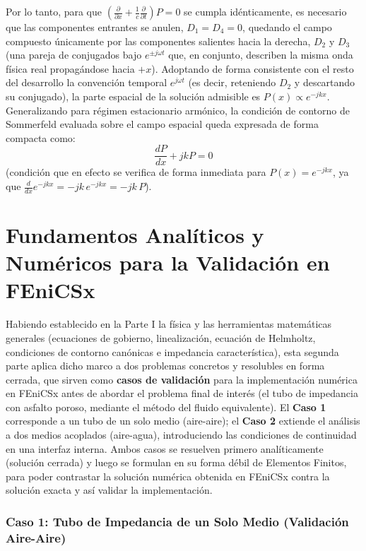 \documentclass[11pt,letterpaper]{article}
\begin{document}
Por lo tanto, para que $\left(\frac{\partial}{\partial x}+\frac1c\frac{\partial}{\partial t}\right)P=0$ se cumpla idénticamente, es necesario que las componentes entrantes se anulen, $D_1 = D_4 = 0$, quedando el campo compuesto únicamente por las componentes salientes hacia la derecha, $D_2$ y $D_3$ (una pareja de conjugados bajo $e^{\pm j\omega t}$ que, en conjunto, describen la misma onda física real propagándose hacia $+x$). Adoptando de forma consistente con el resto del desarrollo la convención temporal $e^{j\omega t}$ (es decir, reteniendo $D_2$ y descartando su conjugado), la parte espacial de la solución admisible es $P(x) \propto e^{-jkx}$. Generalizando para régimen estacionario armónico, la condición de contorno de Sommerfeld evaluada sobre el campo espacial queda expresada de forma compacta como:
\begin{equation}
    \frac{dP}{dx} + jk P = 0
\end{equation}
(condición que en efecto se verifica de forma inmediata para $P(x) = e^{-jkx}$, ya que $\frac{d}{dx}e^{-jkx} = -jk\,e^{-jkx} = -jk\,P$).

\part{Fundamentos Analíticos y Numéricos para la Validación en FEniCSx}

Habiendo establecido en la Parte I la física y las herramientas matemáticas generales (ecuaciones de gobierno, linealización, ecuación de Helmholtz, condiciones de contorno canónicas e impedancia característica), esta segunda parte aplica dicho marco a dos problemas concretos y resolubles en forma cerrada, que sirven como \textbf{casos de validación} para la implementación numérica en FEniCSx antes de abordar el problema final de interés (el tubo de impedancia con asfalto poroso, mediante el método del fluido equivalente). El \textbf{Caso 1} corresponde a un tubo de un solo medio (aire-aire); el \textbf{Caso 2} extiende el análisis a dos medios acoplados (aire-agua), introduciendo las condiciones de continuidad en una interfaz interna. Ambos casos se resuelven primero analíticamente (solución cerrada) y luego se formulan en su forma débil de Elementos Finitos, para poder contrastar la solución numérica obtenida en FEniCSx contra la solución exacta y así validar la implementación.

\section{Caso 1: Tubo de Impedancia de un Solo Medio (Validación Aire-Aire)}
\end{document}
